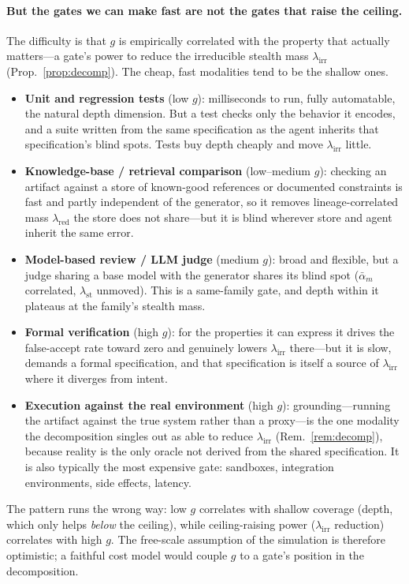 \documentclass[11pt]{article}
\theoremstyle{remark}
\newcommand{\lst}{\lambda_{\mathrm{st}}}
\newcommand{\lred}{\lambda_{\mathrm{red}}}
\newcommand{\lirr}{\lambda_{\mathrm{irr}}}
\newcommand{\am}{\bar\alpha_m}
\begin{document}
\paragraph{But the gates we can make fast are not the gates that raise the ceiling.} The
difficulty is that $g$ is empirically correlated with the property that actually matters---a
gate's power to reduce the irreducible stealth mass $\lirr$ (Prop.~\ref{prop:decomp}). The cheap,
fast modalities tend to be the shallow ones.
\begin{itemize}[leftmargin=1.4em,itemsep=2pt]
\item \textbf{Unit and regression tests} (low $g$): milliseconds to run, fully automatable, the
natural depth dimension. But a test checks only the behavior it encodes, and a suite written from
the same specification as the agent inherits that specification's blind spots. Tests buy depth
cheaply and move $\lirr$ little.
\item \textbf{Knowledge-base / retrieval comparison} (low--medium $g$): checking an artifact
against a store of known-good references or documented constraints is fast and partly independent
of the generator, so it removes lineage-correlated mass $\lred$ the store does not share---but it
is blind wherever store and agent inherit the same error.
\item \textbf{Model-based review / LLM judge} (medium $g$): broad and flexible, but a judge sharing
a base model with the generator shares its blind spot ($\am$ correlated, $\lst$ unmoved). This is
a same-family gate, and depth within it plateaus at the family's stealth mass.
\item \textbf{Formal verification} (high $g$): for the properties it can express it drives the
false-accept rate toward zero and genuinely lowers $\lirr$ there---but it is slow, demands a formal
specification, and that specification is itself a source of $\lirr$ where it diverges from intent.
\item \textbf{Execution against the real environment} (high $g$): grounding---running the artifact
against the true system rather than a proxy---is the one modality the decomposition singles out as
able to reduce $\lirr$ (Rem.~\ref{rem:decomp}), because reality is the only oracle not derived from
the shared specification. It is also typically the most expensive gate: sandboxes, integration
environments, side effects, latency.
\end{itemize}
The pattern runs the wrong way: low $g$ correlates with shallow coverage (depth, which only helps
\emph{below} the ceiling), while ceiling-raising power ($\lirr$ reduction) correlates with high
$g$. The free-scale assumption of the simulation is therefore optimistic; a faithful cost model
would couple $g$ to a gate's position in the decomposition.
\end{document}
